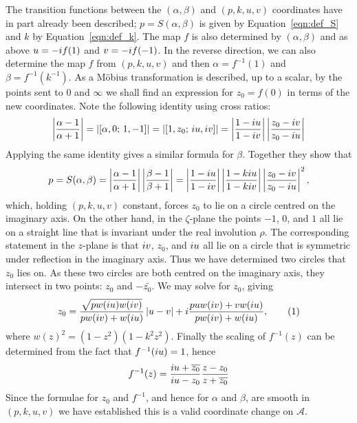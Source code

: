 \documentclass{article}
\begin{document}
The transition functions between the $(\alpha, \beta)$ and $(p,k,u,v)$ coordinates have in part already been described; $p = S(\alpha,\beta)$ is given by Equation~\eqref{eqn:def_S} and $k$ by Equation~\eqref{eqn:def_k}. The map $f$ is also determined by $(\alpha,\beta)$ and as above $u = -i f(1)$ and $v = -i f(-1)$. In the reverse direction, we can also determine the map $f$ from $(p,k,u,v)$ and then $\alpha = f^{-1}(1)$ and $\beta = f^{-1}(k^{-1})$. As a M\"obius transformation is described, up to a scalar, by the points sent to $0$ and $\infty$ we shall find an expression for $z_0 = f(0)$ in terms of the new coordinates. Note the following identity using cross ratios:
\[
\left|\frac{\alpha-1}{\alpha+1}\right|
= \left| \left[\alpha,0;\, 1, -1\right] \right|
= \left| \left[1,z_0;\, i u, i v\right] \right|
= \left|\frac{1-i u}{1 - i v}\right| \left|\frac{z_0 - i v}{z_0 - i u}\right|
\]
Applying the same identity gives a similar formula for $\beta$. Together they show that
\[
p = S(\alpha,\beta)
= \left|\frac{\alpha-1}{\alpha+1}\right| \left|\frac{\beta-1}{\beta+1}\right|
= \left|\frac{1-i u}{1 - i v}\right|\left|\frac{1 - ki u}{1 - ki v}\right| \left|\frac{z_0 - i v}{z_0 - i u}\right|^2,
\]
which, holding $(p,k,u,v)$ constant, forces $z_0$ to lie on a circle centred on the imaginary axis. On the other hand, in the $\zeta$-plane the points $-1$, $0$, and $1$ all lie on a straight line that is invariant under the real involution $\rho$. The corresponding statement in the $z$-plane is that $i v$, $z_0$, and $i u$ all lie on a circle that is symmetric under reflection in the imaginary axis. Thus we have determined two circles that $z_0$ lies on. As these two circles are both centred on the imaginary axis, they intersect in two points: $z_0$ and $-\bar{z_0}$. We may solve for $z_0$, giving
\[
z_0 = \frac{\sqrt{pw(\iu u)w(\iu v)}}{pw(\iu v) + w(\iu u)} \abs{u-v} + \iu\frac{puw(\iu v) + vw(\iu u)}{pw(\iu v) + w(\iu u)},
\labelthis{eqn:formula xy}
\]
where $w(z)^2 = (1-z^2)(1-k^2z^2)$. Finally the scaling of $f^{-1}(z)$ can be determined from the fact that $f^{-1}(i u) = 1$, hence 
\[
f^{-1}(z)
=  \frac{i u + \overline{z_0}}{i u - z_0} \frac{z-z_0}{z + \overline{z_0}}
\]
Since the formulae for $z_0$ and $f^{-1}$, and hence for $\alpha$ and $\beta$, are smooth in $(p,k,u,v)$ we have established this is a valid coordinate change on $\mathcal{A}$.
\end{document}

